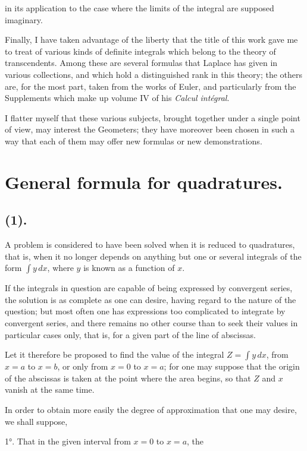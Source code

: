 \documentclass{article}
\begin{document}
in its application to the case where the limits of the integral are supposed imaginary.

Finally, I have taken advantage of the liberty that the title of this work gave me to treat of various kinds of definite integrals which belong to the theory of transcendents. Among these are several formulas that Laplace has given in various collections, and which hold a distinguished rank in this theory; the others are, for the most part, taken from the works of Euler, and particularly from the Supplements which make up volume IV of his \emph{Calcul intégral}.

I flatter myself that these various subjects, brought together under a single point of view, may interest the Geometers; they have moreover been chosen in such a way that each of them may offer new formulas or new demonstrations.

\section*{General formula for quadratures.}

\subsection*{(1).}

A problem is considered to have been solved when it is reduced to quadratures, that is, when it no longer depends on anything but one or several integrals of the form $\displaystyle\int y\,dx$, where $y$ is known as a function of $x$.

If the integrals in question are capable of being expressed by convergent series, the solution is as complete as one can desire, having regard to the nature of the question; but most often one has expressions too complicated to integrate by convergent series, and there remains no other course than to seek their values in particular cases only, that is, for a given part of the line of abscissas.

Let it therefore be proposed to find the value of the integral $\displaystyle Z=\int y\,dx$, from $x=a$ to $x=b$, or only from $x=0$ to $x=a$; for one may suppose that the origin of the abscissas is taken at the point where the area begins, so that $Z$ and $x$ vanish at the same time.

In order to obtain more easily the degree of approximation that one may desire, we shall suppose,

1°. That in the given interval from $x=0$ to $x=a$, the
\end{document}
